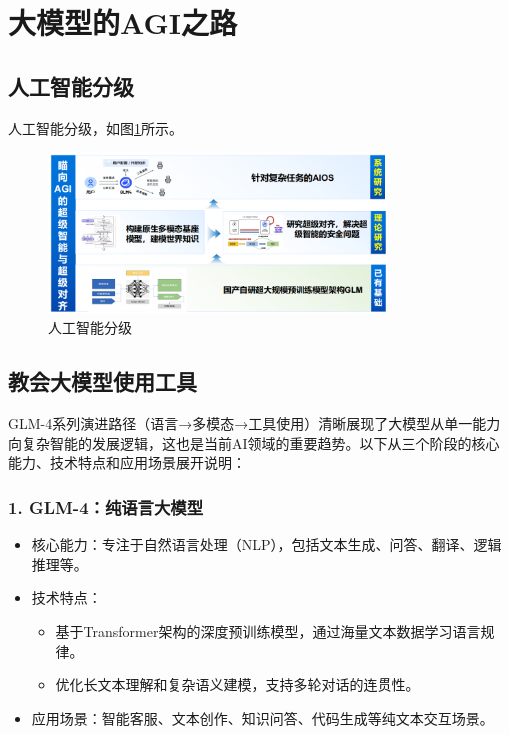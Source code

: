 \section{大模型的AGI之路}

\subsection{人工智能分级}

人工智能分级，如图\ref{fig:ailevel}所示。

\begin{figure}[H]
	\centering
	\includegraphics[width=0.8\textwidth]{figures/chapter1/fig16.png}
	\caption{人工智能分级}
	\label{fig:ailevel}
\end{figure}

\subsection{教会大模型使用工具}

GLM-4系列演进路径（语言→多模态→工具使用）清晰展现了大模型从单一能力向复杂智能的发展逻辑，这也是当前AI领域的重要趋势。以下从三个阶段的核心能力、技术特点和应用场景展开说明：

\subsubsection{1. GLM-4：纯语言大模型}

\begin{itemize}
	\item 核心能力：专注于自然语言处理（NLP），包括文本生成、问答、翻译、逻辑推理等。
	\item 技术特点：
		\begin{itemize}
			\item 基于Transformer架构的深度预训练模型，通过海量文本数据学习语言规律。
			\item 优化长文本理解和复杂语义建模，支持多轮对话的连贯性。
		\end{itemize}
	\item 应用场景：智能客服、文本创作、知识问答、代码生成等纯文本交互场景。
\end{itemize}

